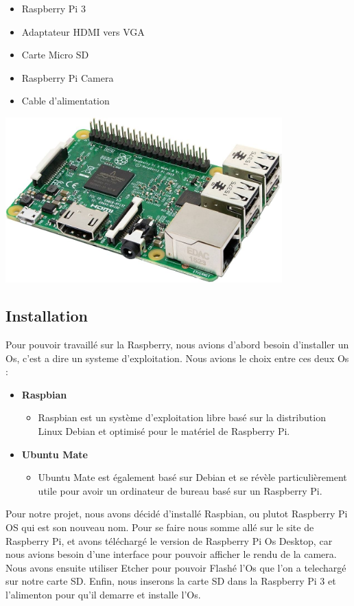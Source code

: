 \documentclass{article}
\begin{document}
\begin{minipage}{0.5\textwidth}
    \begin{itemize}
    \item Raspberry Pi 3
    \item Adaptateur HDMI vers VGA
    \item Carte Micro SD
    \item Raspberry Pi Camera
    \item Cable d'alimentation
    \end{itemize}
\end{minipage}%
\begin{minipage}{0.5\textwidth}
    \vspace{20pt}
    \centering
    \includegraphics[width=0.8\textwidth]{image/raspberry_pi_3.jpg}
    \label{fig:tset}
\end{minipage}


\subsection{Installation}
Pour pouvoir travaillé sur la Raspberry, nous avions d'abord besoin d'installer un Os, c'est a dire un systeme d'exploitation.
Nous avions le choix entre ces deux Os :
\begin{itemize}
    \item \textbf{Raspbian}
    \begin{itemize}
        \item Raspbian est un système d’exploitation libre basé sur la distribution Linux Debian et optimisé pour le matériel de Raspberry Pi.
    \end{itemize}
    \item \textbf{Ubuntu Mate}
    \begin{itemize}
        \item Ubuntu Mate est également basé sur Debian et se révèle particulièrement utile pour avoir un ordinateur de bureau basé sur un Raspberry Pi.
    \end{itemize}
\end{itemize}
Pour notre projet, nous avons décidé d'installé Raspbian, ou plutot Raspberry Pi OS qui est son nouveau nom.
Pour se faire nous somme allé sur le site de Raspberry Pi, et avons téléchargé le version de Raspberry Pi Os Desktop, car nous avions besoin d'une interface pour pouvoir afficher le rendu de la camera.
Nous avons ensuite utiliser Etcher pour pouvoir Flashé l'Os que l'on a telechargé sur notre carte SD.
Enfin, nous inserons la carte SD dans la Raspberry Pi 3 et l'alimenton pour qu'il demarre et installe l'Os.
\end{document}
